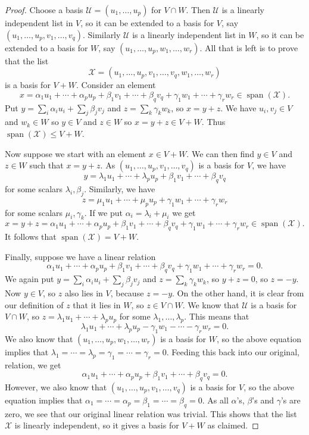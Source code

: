 \documentclass{amsart}
\newcommand{\spn}       {\operatorname{span}}
\newcommand{\al}        {\alpha}
\newcommand{\bt}        {\beta}
\newcommand{\gm}        {\gamma}
\newcommand{\lm}        {\lambda}
\newcommand{\CU}        {{\mathcal{U}}}
\newcommand{\CX}        {{\mathcal{X}}}
\renewcommand{\:}       {\colon}
\theoremstyle{definition}
\begin{document}
\begin{proof}
 Choose a basis $\CU=(u_1,\dotsc,u_p)$ for $V\cap W$.  Then
 $\CU$ is a linearly independent list in $V$, so it can be
 extended to a basis for $V$, say
 $(u_1,\dotsc,u_p,v_1,\dotsc,v_q)$.  Similarly $\CU$ is a
 linearly independent list in $W$, so it can be extended to
 a basis for $W$, say $(u_1,\dotsc,u_p,w_1,\dotsc,w_r)$.
 All that is left is to prove that the list
 \[ \CX = (u_1,\dotsc,u_p,v_1,\dotsc,v_q,w_1,\dotsc,w_r) \] 
 is a basis for $V+W$.  Consider an element
 \[ x = \al_1u_1 + \dotsb + \al_pu_p + 
        \bt_1v_1 + \dotsb + \bt_qv_q + 
        \gm_1w_1 + \dotsb + \gm_rw_r \in\spn(\CX).
 \]
 Put $y=\sum_i\al_iu_i+\sum_j\bt_jv_j$ and
 $z=\sum_k\gm_kw_k$, so $x=y+z$.  We have $u_i,v_j\in V$ and
 $w_k\in W$ so $y\in V$ and $z\in W$ so $x=y+z\in V+W$.
 Thus $\spn(\CX)\leq V+W$.

 Now suppose we start with an element $x\in V+W$.  We can
 then find $y\in V$ and $z\in W$ such that $x=y+z$.  As
 $(u_1,\dotsc,u_p,v_1,\dotsc,v_q)$ is a basis for $V$, we
 have 
 \[ y = \lm_1u_1+\dotsb+\lm_pu_p+\bt_1v_1+\dotsb+\bt_qv_q \]
 for some scalars $\lm_i,\bt_j$.  Similarly, we have
 \[ z = \mu_1u_1+\dotsb+\mu_pu_p+\gm_1w_1+\dotsb+\gm_rw_r \]
 for some scalars $\mu_i,\gm_k$.  If we put
 $\al_i=\lm_i+\mu_i$ we get 
 \[ x=y+z=
        \al_1u_1 + \dotsb + \al_pu_p + 
        \bt_1v_1 + \dotsb + \bt_qv_q + 
        \gm_1w_1 + \dotsb + \gm_rw_r \in\spn(\CX).
 \]
 It follows that $\spn(\CX)=V+W$.

 Finally, suppose we have a linear relation
 \[ \al_1u_1 + \dotsb + \al_pu_p + 
    \bt_1v_1 + \dotsb + \bt_qv_q + 
    \gm_1w_1 + \dotsb + \gm_rw_r = 0.
 \]
 We again put $y=\sum_i\al_iu_i+\sum_j\bt_jv_j$ and
 $z=\sum_k\gm_kw_k$, so $y+z=0$, so $z=-y$.  Now $y\in V$,
 so $z$ also lies in $V$, because $z=-y$.  On the other
 hand, it is clear from our definition of $z$ that it lies
 in $W$, so $z\in V\cap W$.  We know that $\CU$ is a basis
 for $V\cap W$, so $z=\lm_1u_1+\dotsb+\lm_pu_p$ for some
 $\lm_1,\dotsc,\lm_p$.  This means that
 \[ \lm_1u_1+\dotsb+\lm_pu_p-\gm_1w_1-\dotsb-\gm_rw_r=0. \]
 We also know that $(u_1,\dotsc,u_p,w_1,\dotsc,w_r)$ is a
 basis for $W$, so the above equation implies that
 $\lm_1=\dotsb=\lm_p=\gm_1=\dotsb=\gm_r=0$.  Feeding this
 back into our original, relation, we get
 \[ \al_1u_1 + \dotsb + \al_pu_p + 
    \bt_1v_1 + \dotsb + \bt_qv_q  = 0.
 \]
 However, we also know that
 $(u_1,\dotsc,u_p,v_1,\dotsc,v_q)$ is a basis for $V$, so
 the above equation implies that
 $\al_1=\dotsb=\al_p=\bt_1=\dotsb=\bt_q=0$.  As all $\al$'s,
 $\bt$'s and $\gm$'s are zero, we see that our original
 linear relation was trivial.  This shows that the list
 $\CX$ is linearly independent, so it gives a basis for
 $V+W$ as claimed.
\end{proof}
\end{document}
